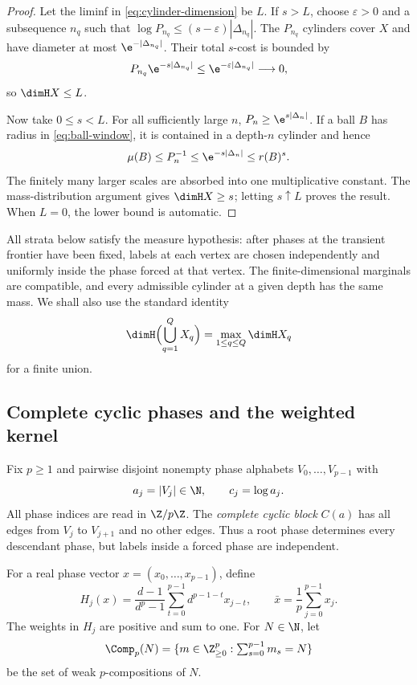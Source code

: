 \begin{proof}
Let the liminf in \eqref{eq:cylinder-dimension} be $L$.  If $s>L$, choose
$\varepsilon>0$ and a subsequence $n_q$ such that
$\log P_{n_q}\leq(s-\varepsilon)|\Delta_{n_q}|$.  The $P_{n_q}$ cylinders
cover $X$ and have diameter at most $\e^{-|\Delta_{n_q}|}$.  Their total
$s$-cost is bounded by
\[
 P_{n_q}\e^{-s|\Delta_{n_q}|}
 \leq \e^{-\varepsilon|\Delta_{n_q}|}\longrightarrow0,
\]
so $\dimH X\leq L$.

Now take $0\leq s<L$.  For all sufficiently large $n$,
$P_n\geq\e^{s|\Delta_n|}$.  If a ball $B$ has radius in
\eqref{eq:ball-window}, it is contained in a depth-$n$ cylinder and hence
\[
 \mu(B)\leq P_n^{-1}\leq\e^{-s|\Delta_n|}\leq r(B)^s.
\]
The finitely many larger scales are absorbed into one multiplicative
constant.  The mass-distribution argument gives $\dimH X\geq s$; letting
$s\uparrow L$ proves the result.  When $L=0$, the lower bound is automatic.
\end{proof}

All strata below satisfy the measure hypothesis: after phases at the
transient frontier have been fixed, labels at each vertex are chosen
independently and uniformly inside the phase forced at that vertex.  The
finite-dimensional marginals are compatible, and every admissible cylinder
at a given depth has the same mass.  We shall also use the standard identity
\begin{equation}
 \dimH\Bigl(\bigcup_{q=1}^Q X_q\Bigr)=\max_{1\leq q\leq Q}\dimH X_q
 \label{eq:finite-union}
\end{equation}
for a finite union.

\subsection{Complete cyclic phases and the weighted kernel}

Fix $p\geq1$ and pairwise disjoint nonempty phase alphabets
$V_0,\ldots,V_{p-1}$ with
\[
 a_j=|V_j|\in\N,
 \qquad c_j=\log a_j.
\]
All phase indices are read in $\Z/p\Z$.  The \emph{complete cyclic block}
$C(a)$ has all edges from $V_j$ to $V_{j+1}$ and no other edges.  Thus a root
phase determines every descendant phase, but labels inside a forced phase are
independent.

For a real phase vector $x=(x_0,\ldots,x_{p-1})$, define
\begin{equation}
 H_j(x)=\frac{d-1}{d^p-1}
 \sum_{t=0}^{p-1}d^{p-1-t}x_{j-t},
 \qquad
 \bar x=\frac1p\sum_{j=0}^{p-1}x_j.
 \label{eq:H-definition}
\end{equation}
The weights in $H_j$ are positive and sum to one.  For $N\in\N$, let
\begin{equation}
 \Comp_p(N)=\{m\in\Z_{\geq0}^p:\textstyle\sum_{s=0}^{p-1}m_s=N\}
 \label{eq:compositions}
\end{equation}
be the set of weak $p$-compositions of $N$.

